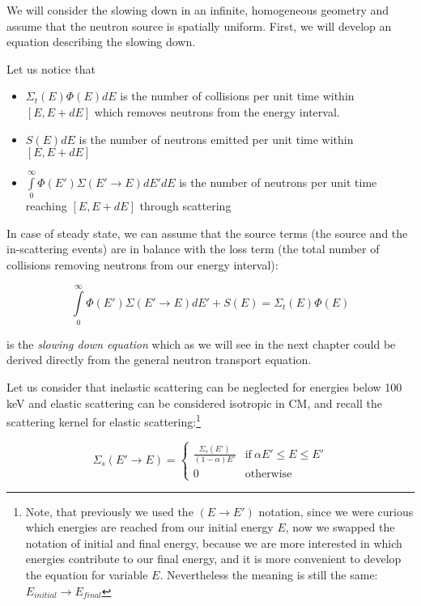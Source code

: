 We will consider the slowing down in an infinite, homogeneous geometry and assume that the neutron source is spatially uniform. First, we will develop an equation describing the slowing down.

Let us notice that 

\begin{itemize}
\item $\Sigma_t(E)\Phi(E)dE$ is the number of collisions per unit time within $[E,E+dE]$ which removes neutrons from the energy interval.
\item $S(E)dE$ is the number of neutrons emitted per unit time within $[E,E+dE]$
\item $\int\limits_0^\infty \Phi(E')\Sigma(E'\rightarrow E)dE'dE$ is the number of neutrons per unit time reaching $[E,E+dE]$ through scattering
\end{itemize}

In case of steady state, we can assume that the source terms (the source and the in-scattering events) are in balance with the loss term (the total number of collisions removing neutrons from our energy interval):

\begin{equation}
\int\limits_0^\infty \Phi(E')\Sigma(E'\rightarrow E)dE'+S(E)=\Sigma_t(E)\Phi(E)
\end{equation}

\noindent is the \textit{slowing down equation} which as we will see in the next chapter could be derived directly from the general neutron transport equation.

Let us consider that inelastic scattering can be neglected for energies below 100 keV and elastic scattering can be considered isotropic in CM, and recall the scattering kernel for elastic scattering:\footnote{Note, that previously we used the $(E\rightarrow E')$ notation, since we were curious which energies are reached from our initial energy $E$, now we swapped the notation of initial and final energy, because we are more interested in which energies contribute to our final energy, and it is more convenient to develop the equation for variable $E$. Nevertheless the meaning is still the same: $E_{initial}\rightarrow E_{final}$}

\begin{equation}\label{eq:scatkernel}
    \Sigma_s(E'\rightarrow E) = 
    \begin{cases}
      \frac{\Sigma_s(E')}{(1-\alpha)E'} & \text{if} \: \alpha E' \leq E \leq E' \\
      0 & \text{otherwise}
    \end{cases}
\end{equation}

